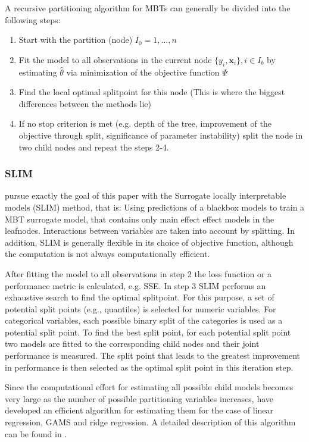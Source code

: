 A recursive partitioning algorithm for MBTs can generally be divided into the following steps:
\begin{enumerate}
    \item Start with the partition (node) $I_0 = 1,...,n$
    \item Fit the model to all observations in the current node $\{y_{i}, \mathbf{x}_{i}\}, i \in I_b$ by estimating $\hat{\theta}$ via minimization of the objective function $\Psi$
    \item Find the local optimal splitpoint for this node (This is where the biggest differences between the methods lie)
    \item If no stop criterion is met (e.g. depth of the tree, improvement of the objective through split, significance of parameter instability) split the node in two child nodes and repeat the steps 2-4.
\end{enumerate}

\subsubsection{SLIM}
\citep{Hu.2020} pursue exactly the goal of this paper with the Surrogate locally interpretable models (SLIM) method, that is: Using predictions of a blackbox models to train a MBT surrogate model, that contains only main effect effect models in the leafnodes. Interactions between variables are taken into account by splitting. In addition, SLIM is generally flexible in its choice of objective function, although the computation is not always computationally efficient.

After fitting the model to all observations in step 2 the loss function or a performance metric is calculated, e.g. SSE.
In step 3 SLIM performs an exhaustive search to find the optimal splitpoint.  
For this purpose, a set of potential split points (e.g., quantiles) is selected for numeric variables. For categorical variables, each possible binary split of the categories is used as a potential split point.
To find the best split point, for each potential split point two models are fitted to the corresponding child nodes and their joint performance is measured. The split point that leads to the greatest improvement in performance is then selected as the optimal split point in this iteration step.

Since the computational effort for estimating all possible child models becomes very large as the number of possible partitioning variables increases, \citep{Hu.2020} have developed an efficient algorithm for estimating them for the case of linear regression, GAMS and ridge regression. A detailed description of this algorithm can be found in \citep{Hu.2020}.


